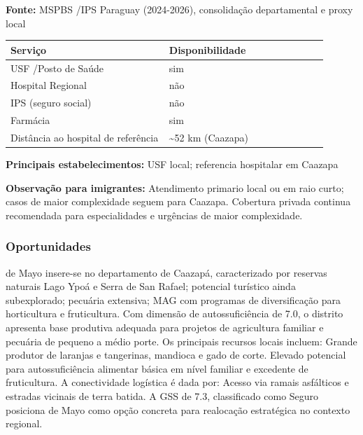 \textbf{Fonte:} MSPBS /\allowbreak  IPS Paraguay (2024-2026), consolidação
departamental e proxy local

{\def\LTcaptype{none} %
\begin{longtable}{@{}>{\raggedright\arraybackslash}p{0.45\linewidth} >{\raggedright\arraybackslash}p{0.45\linewidth}@{}}
\toprule\noalign{}
Serviço & Disponibilidade \\
\midrule\noalign{}
\endhead
\bottomrule\noalign{}
\endlastfoot
USF /\allowbreak  Posto de Saúde & sim \\
Hospital Regional & não \\
IPS (seguro social) & não \\
Farmácia & sim \\
Distância ao hospital de referência & \textasciitilde52 km (Caazapa) \\
\end{longtable}
}

\textbf{Principais estabelecimentos:} USF local; referencia hospitalar
em Caazapa

\textbf{Observação para imigrantes:} Atendimento primario local ou em
raio curto; casos de maior complexidade seguem para Caazapa. Cobertura
privada continua recomendada para especialidades e urgências de maior
complexidade.
\newpage

\subsubsection*{Oportunidades}\label{oport-de-mayo-0611}
de Mayo insere-se no departamento de Caazapá, caracterizado por reservas naturais Lago Ypoá e Serra de San Rafael; potencial turístico ainda subexplorado; pecuária extensiva; MAG com programas de diversificação para horticultura e fruticultura. Com dimensão de autossuficiência de 7.0, o distrito apresenta base produtiva adequada para projetos de agricultura familiar e pecuária de pequeno a médio porte. Os principais recursos locais incluem: Grande produtor de laranjas e tangerinas, mandioca e gado de corte. Elevado potencial para autossuficiência alimentar básica em nível familiar e excedente de fruticultura. A conectividade logística é dada por: Acesso via ramais asfálticos e estradas vicinais de terra batida. A GSS de 7.3, classificado como Seguro posiciona de Mayo como opção concreta para realocação estratégica no contexto regional.

